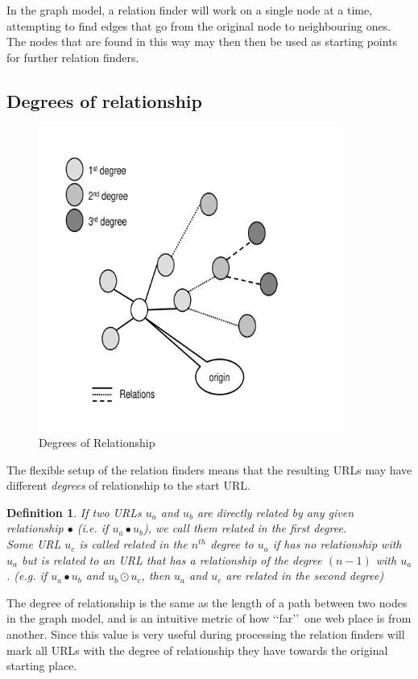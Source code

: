 \documentclass[a4paper]{danarticle}
\newtheorem{definition}{Definition}
\theoremstyle{remark}
\begin{document}
       In the graph model, a relation finder will work on a single node at a 
       time, attempting to find edges that go from the original node to 
       neighbouring ones. The nodes that are found in this way may then then be 
       used as starting points for further relation finders.
     \subsection{Degrees of relationship}
       \begin{figure}[ht]
       \centering
	 \includegraphics[width=10cm]{degrees}
	 \caption{Degrees of Relationship}
	 \label{degrees}
       \end{figure}
       The flexible setup of the relation finders means that the resulting 
       URLs may have different \textit{degrees} of relationship to the start 
       URL. 
       \begin{definition}
       If two URLs $ u_a $ and $ u_b $ are directly related by any given
       relationship $ \bullet $ (i.e. if $ u_a \bullet u_b $), 
       we call them related in the first degree.\\
       Some URL $ u_c $ is called related in the $ n^{th} $ degree to $ u_a $ if
       has no relationship with $ u_a $  but is related to an URL that 
       has a relationship of the degree $ (n-1) $ with $ u_a $. (e.g. if 
       $ u_a \bullet u_b$ and $ u_b \odot u_c $, then $ u_a $ and $ u_c $ are
       related in the second degree)
       \end{definition}
       The degree of relationship is the same as the length of a path between 
       two nodes in the graph model, and is an intuitive metric of how 
       \lq\lq far\rq\rq\ one web place is from another. Since this value is very 
       useful during processing the relation finders will mark all URLs with the 
       degree of relationship they have towards the original starting place.
\end{document}
